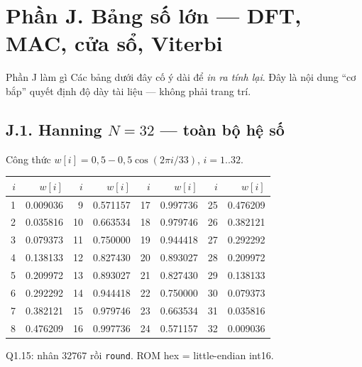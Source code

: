 \section*{Phần J. Bảng số lớn --- DFT, MAC, cửa sổ, Viterbi}
\begin{firstprin}{Phần J làm gì}
Các bảng dưới đây cố ý dài để \emph{in ra tính lại}. Đây là nội dung ``cơ bắp'' quyết định độ dày tài liệu --- không phải trang trí.
\end{firstprin}
\subsection*{J.1. Hanning $N=32$ --- toàn bộ hệ số}
Công thức $w[i]=0{,}5-0{,}5\cos(2\pi i/33)$, $i=1..32$.
\begin{center}\scriptsize
\begin{tabular}{@{}rrrrrrrr@{}}
\toprule
$i$ & $w[i]$ & $i$ & $w[i]$ & $i$ & $w[i]$ & $i$ & $w[i]$ \\
\midrule
1 & 0.009036 & 9 & 0.571157 & 17 & 0.997736 & 25 & 0.476209 \\
2 & 0.035816 & 10 & 0.663534 & 18 & 0.979746 & 26 & 0.382121 \\
3 & 0.079373 & 11 & 0.750000 & 19 & 0.944418 & 27 & 0.292292 \\
4 & 0.138133 & 12 & 0.827430 & 20 & 0.893027 & 28 & 0.209972 \\
5 & 0.209972 & 13 & 0.893027 & 21 & 0.827430 & 29 & 0.138133 \\
6 & 0.292292 & 14 & 0.944418 & 22 & 0.750000 & 30 & 0.079373 \\
7 & 0.382121 & 15 & 0.979746 & 23 & 0.663534 & 31 & 0.035816 \\
8 & 0.476209 & 16 & 0.997736 & 24 & 0.571157 & 32 & 0.009036 \\
\bottomrule
\end{tabular}
\end{center}
Q1.15: nhân $32767$ rồi \texttt{round}. ROM hex = little-endian int16.

